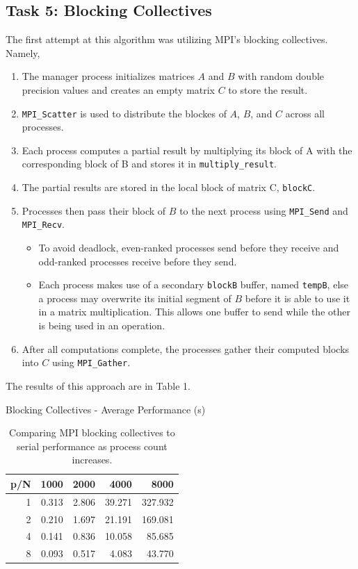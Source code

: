\documentclass{article}
\begin{document}
\subsection*{Task 5: Blocking Collectives}
The first attempt at this algorithm was utilizing MPI's blocking collectives. Namely, 
\begin{enumerate}
    \item The manager process initializes matrices $A$ and $B$ with random double
    precision values and creates an empty matrix $C$ to store the result.
    \item \texttt{MPI\_Scatter} is used to distribute the blockes of $A$, $B$, and $C$ across all processes.
    \item Each process computes a partial result by multiplying its block of A with the corresponding block of B and stores it in \texttt{multiply\_result}.
    \item The partial results are stored in the local block of matrix C, \texttt{blockC}.
    \item Processes then pass their block of $B$ to the next process using \texttt{MPI\_Send} and \texttt{MPI\_Recv}.
    \begin{itemize}
        \item To avoid deadlock, even-ranked processes send before they receive and odd-ranked processes receive before they send.
        \item Each process makes use of a secondary \texttt{blockB} buffer, named \texttt{tempB}, else a process may overwrite its initial segment of $B$ before it is able to use it in a matrix multiplication. 
        This allows one buffer to send while the other is being used in an operation.
    \end{itemize}
    \item After all computations complete, the processes gather their computed blocks into $C$ using \texttt{MPI\_Gather}.
\end{enumerate}
The results of this approach are in Table 1. 
\begin{table}[H]
    \centering
    \caption{Blocking Collectives - Average Performance (s)}
    \fontsize{12}{14}\selectfont
    \begin{tabular}[t]{rrrrr}
    \toprule
    p/N  & 1000 & 2000 & 4000 & 8000\\
    \midrule
    1 & 0.313 & 2.806 & 39.271 & 327.932\\
    2 & 0.210 & 1.697 & 21.191 & 169.081\\
    4 & 0.141 & 0.836 & 10.058 & 85.685\\
    8 & 0.093 & 0.517 & 4.083 & 43.770\\
    \bottomrule
    \end{tabular}
    \caption*{Comparing MPI blocking collectives to serial performance as process count increases.}
\end{table}
\end{document}
